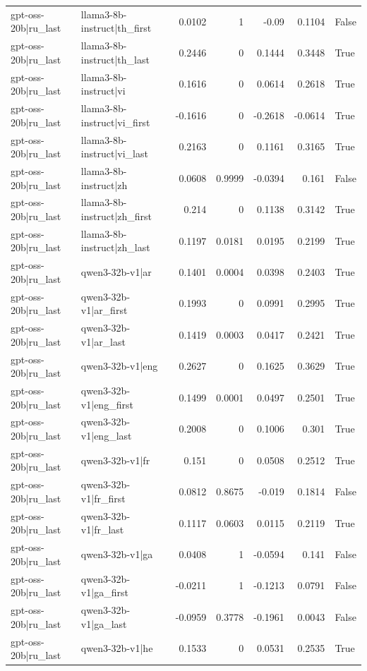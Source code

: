 \begin{table}
\begin{tabular}{l l r r r r l}
gpt-oss-20b|ru_last & llama3-8b-instruct|th_first & 0.0102 & 1 & -0.09 & 0.1104 & False \\
gpt-oss-20b|ru_last & llama3-8b-instruct|th_last & 0.2446 & 0 & 0.1444 & 0.3448 & True \\
gpt-oss-20b|ru_last & llama3-8b-instruct|vi & 0.1616 & 0 & 0.0614 & 0.2618 & True \\
gpt-oss-20b|ru_last & llama3-8b-instruct|vi_first & -0.1616 & 0 & -0.2618 & -0.0614 & True \\
gpt-oss-20b|ru_last & llama3-8b-instruct|vi_last & 0.2163 & 0 & 0.1161 & 0.3165 & True \\
gpt-oss-20b|ru_last & llama3-8b-instruct|zh & 0.0608 & 0.9999 & -0.0394 & 0.161 & False \\
gpt-oss-20b|ru_last & llama3-8b-instruct|zh_first & 0.214 & 0 & 0.1138 & 0.3142 & True \\
gpt-oss-20b|ru_last & llama3-8b-instruct|zh_last & 0.1197 & 0.0181 & 0.0195 & 0.2199 & True \\
gpt-oss-20b|ru_last & qwen3-32b-v1|ar & 0.1401 & 0.0004 & 0.0398 & 0.2403 & True \\
gpt-oss-20b|ru_last & qwen3-32b-v1|ar_first & 0.1993 & 0 & 0.0991 & 0.2995 & True \\
gpt-oss-20b|ru_last & qwen3-32b-v1|ar_last & 0.1419 & 0.0003 & 0.0417 & 0.2421 & True \\
gpt-oss-20b|ru_last & qwen3-32b-v1|eng & 0.2627 & 0 & 0.1625 & 0.3629 & True \\
gpt-oss-20b|ru_last & qwen3-32b-v1|eng_first & 0.1499 & 0.0001 & 0.0497 & 0.2501 & True \\
gpt-oss-20b|ru_last & qwen3-32b-v1|eng_last & 0.2008 & 0 & 0.1006 & 0.301 & True \\
gpt-oss-20b|ru_last & qwen3-32b-v1|fr & 0.151 & 0 & 0.0508 & 0.2512 & True \\
gpt-oss-20b|ru_last & qwen3-32b-v1|fr_first & 0.0812 & 0.8675 & -0.019 & 0.1814 & False \\
gpt-oss-20b|ru_last & qwen3-32b-v1|fr_last & 0.1117 & 0.0603 & 0.0115 & 0.2119 & True \\
gpt-oss-20b|ru_last & qwen3-32b-v1|ga & 0.0408 & 1 & -0.0594 & 0.141 & False \\
gpt-oss-20b|ru_last & qwen3-32b-v1|ga_first & -0.0211 & 1 & -0.1213 & 0.0791 & False \\
gpt-oss-20b|ru_last & qwen3-32b-v1|ga_last & -0.0959 & 0.3778 & -0.1961 & 0.0043 & False \\
gpt-oss-20b|ru_last & qwen3-32b-v1|he & 0.1533 & 0 & 0.0531 & 0.2535 & True \\

\end{tabular}
\end{table}
